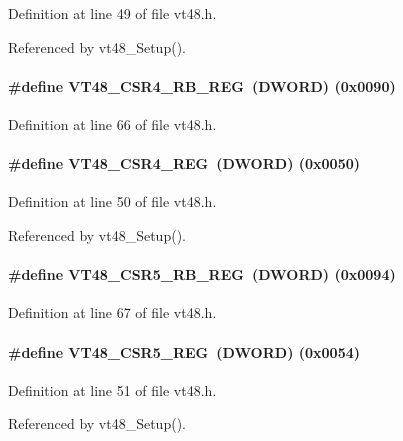 Definition at line 49 of file vt48.h.

Referenced by vt48\_\-Setup().
\paragraph[{VT48\_\-CSR4\_\-RB\_\-REG}]{\setlength{\rightskip}{0pt plus 5cm}\#define VT48\_\-CSR4\_\-RB\_\-REG~({\bf DWORD}) (0x0090)}\hfill\label{vt48_8h_a8d29a9fb1ea8c4e64732cbaa7d09a8df}


Definition at line 66 of file vt48.h.
\paragraph[{VT48\_\-CSR4\_\-REG}]{\setlength{\rightskip}{0pt plus 5cm}\#define VT48\_\-CSR4\_\-REG~({\bf DWORD}) (0x0050)}\hfill\label{vt48_8h_a2c6797141c318812f46eca1ed7d7d5e2}


Definition at line 50 of file vt48.h.

Referenced by vt48\_\-Setup().
\paragraph[{VT48\_\-CSR5\_\-RB\_\-REG}]{\setlength{\rightskip}{0pt plus 5cm}\#define VT48\_\-CSR5\_\-RB\_\-REG~({\bf DWORD}) (0x0094)}\hfill\label{vt48_8h_a61969611cb0e1eee74a73330f221f74b}


Definition at line 67 of file vt48.h.
\paragraph[{VT48\_\-CSR5\_\-REG}]{\setlength{\rightskip}{0pt plus 5cm}\#define VT48\_\-CSR5\_\-REG~({\bf DWORD}) (0x0054)}\hfill\label{vt48_8h_a24a7e4d13e0094230eb0b8f6c1264947}


Definition at line 51 of file vt48.h.

Referenced by vt48\_\-Setup().
